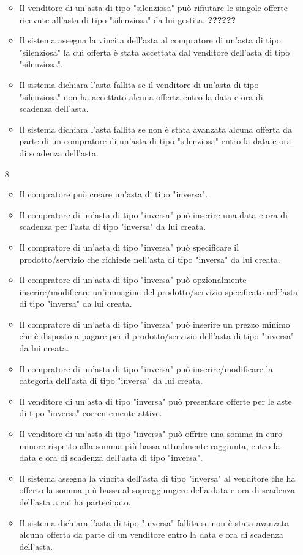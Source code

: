 \begin{itemize}
\begin{itemize}
                    \item Il venditore di un'asta di tipo "silenziosa" può rifiutare le singole offerte ricevute all'asta di tipo "silenziosa" da lui gestita. \textbf{??????}
                    \item Il sistema assegna la vincita dell'asta al compratore di un'asta di tipo "silenziosa" la cui offerta è stata accettata dal venditore dell'asta di tipo "silenziosa".
                    \item Il sistema dichiara l'asta fallita se il venditore di un'asta di tipo "silenziosa" non ha accettato alcuna offerta entro la data e ora di scadenza dell'asta.
                    \item Il sistema dichiara l'asta fallita se non è stata avanzata alcuna offerta da parte di un compratore di un'asta di tipo "silenziosa" entro la data e ora di scadenza dell'asta.
                \end{itemize}
            \item[8]
                \begin{itemize}            
                    \item Il compratore può creare un'asta di tipo "inversa".
                    \item Il compratore di un'asta di tipo "inversa" può inserire una data e ora di scadenza per l'asta di tipo "inversa" da lui creata.
                    \item Il compratore di un'asta di tipo "inversa" può specificare il prodotto/servizio che richiede nell'asta di tipo "inversa" da lui creata.
                    \item Il compratore di un'asta di tipo "inversa" può opzionalmente inserire/modificare un'immagine del prodotto/servizio specificato nell'asta di tipo "inversa" da lui creata.
                    \item Il compratore di un'asta di tipo "inversa" può inserire un prezzo minimo che è disposto a pagare per il prodotto/servizio dell'asta di tipo "inversa" da lui creata.
                    \item Il compratore di un'asta di tipo "inversa" può inserire/modificare la categoria dell'asta di tipo "inversa" da lui creata.
                    \item Il venditore di un'asta di tipo "inversa" può presentare offerte per le aste di tipo "inversa" correntemente attive.
                    \item Il venditore di un'asta di tipo "inversa" può offrire una somma in euro minore rispetto alla somma più bassa attualmente raggiunta, entro la data e ora di scadenza dell'asta di tipo "inversa".
                    \item Il sistema assegna la vincita dell'asta di tipo "inversa" al venditore che ha offerto la somma più bassa al sopraggiungere della data e ora di scadenza dell'asta a cui ha partecipato.
                    \item Il sistema dichiara l'asta di tipo "inversa" fallita se non è stata avanzata alcuna offerta da parte di un venditore entro la data e ora di scadenza dell'asta.
                \end{itemize}
        \end{itemize}